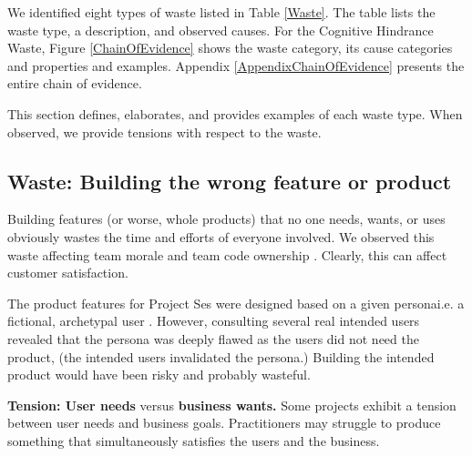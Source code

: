 
We identified eight types of waste listed in Table \ref{Waste}. The table lists the waste type, a description, and observed causes. For the Cognitive Hindrance Waste, Figure \ref{ChainOfEvidence} shows the waste category, its cause categories and properties and examples. Appendix \ref{AppendixChainOfEvidence} presents the entire chain of evidence.

This section defines, elaborates, and provides examples of each waste type. When observed, we provide tensions with respect to the waste.

\subsection{Waste: Building the wrong feature or product}
Building features (or worse, whole products) that no one needs, wants, or uses obviously wastes the time and efforts of everyone involved. We observed this waste affecting team morale and team code ownership \cite{SedanoTeamCodeOwnership}. Clearly, this can affect customer satisfaction. 

The product features for Project Ses were designed based on a given persona\textemdash i.e. a fictional, archetypal user \cite{Grudin2002personas}. However, consulting several real intended users revealed that the persona was deeply flawed as the users did not need the product, (the intended users invalidated the persona.) Building the intended product would have been risky and probably wasteful. 

\textbf{Tension: User needs} versus \textbf{business wants.}
Some projects exhibit a tension between user needs and business goals. Practitioners may struggle to produce something that simultaneously satisfies the users and the business.

